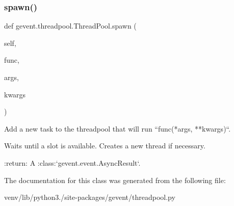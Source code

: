 \subsubsection{\texorpdfstring{spawn()}{spawn()}}
{\footnotesize\ttfamily def gevent.\+threadpool.\+Thread\+Pool.\+spawn (\begin{DoxyParamCaption}\item[{}]{self,  }\item[{}]{func,  }\item[{}]{args,  }\item[{}]{kwargs }\end{DoxyParamCaption})}

\begin{DoxyVerb}Add a new task to the threadpool that will run ``func(*args, **kwargs)``.

Waits until a slot is available. Creates a new thread if necessary.

:return: A :class:`gevent.event.AsyncResult`.
\end{DoxyVerb}
 

The documentation for this class was generated from the following file\+:\begin{DoxyCompactItemize}
\item 
venv/lib/python3./site-\/packages/gevent/threadpool.\+py\end{DoxyCompactItemize}

